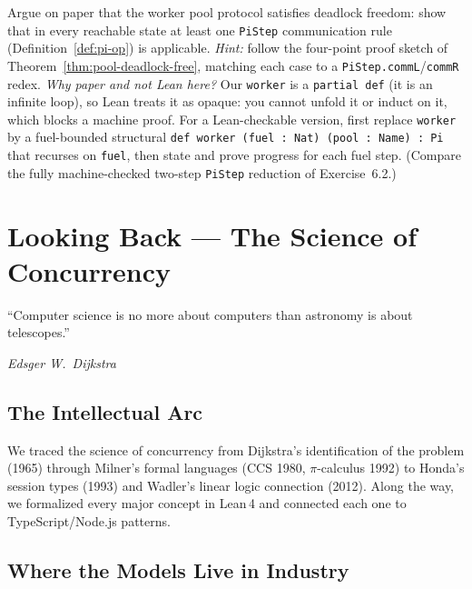 \documentclass[11pt, a4paper, oneside]{book}
\newcommand{\lc}[1]{\texttt{#1}}
\newcounter{exercise}[chapter]
\begin{document}
\begin{exercisebox}[title={Exercise 12.2}]
Argue on paper that the worker pool protocol satisfies deadlock freedom: show
that in every reachable state at least one \lc{PiStep} communication rule
(Definition~\ref{def:pi-op}) is applicable. \emph{Hint:} follow the four-point
proof sketch of Theorem~\ref{thm:pool-deadlock-free}, matching each case to a
\lc{PiStep.commL}/\lc{commR} redex. \emph{Why paper and not Lean here?} Our
\lc{worker} is a \lc{partial def} (it is an infinite loop), so Lean treats it
as opaque: you cannot unfold it or induct on it, which blocks a machine proof.
For a Lean-checkable version, first replace \lc{worker} by a fuel-bounded
structural \lc{def worker (fuel : Nat) (pool : Name) : Pi} that recurses on
\lc{fuel}, then state and prove progress for each fuel step. (Compare the
fully machine-checked two-step \lc{PiStep} reduction of Exercise~6.2.)
\end{exercisebox}

\chapter{Looking Back --- The Science of Concurrency}

\epigraph{``Computer science is no more about computers than astronomy is
about telescopes.''}{\textit{Edsger W.\ Dijkstra}}

\section{The Intellectual Arc}

We traced the science of concurrency from Dijkstra's identification of the
problem (1965) through Milner's formal languages (CCS 1980, $\pi$-calculus
1992) to Honda's session types (1993) and Wadler's linear logic connection
(2012). Along the way, we formalized every major concept in Lean\,4 and
connected each one to TypeScript/Node.js patterns.

\section{Where the Models Live in Industry}
\end{document}
